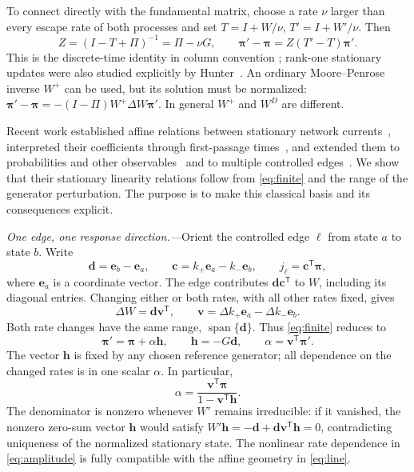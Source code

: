 \documentclass[
  reprint,
  superscriptaddress,
  amsmath,
  amssymb,
  aps,
  pre,
  longbibliography
]{revtex4-2}
\begin{document}
To connect directly with the fundamental matrix, choose a rate
$\nu$ larger than every escape rate of both processes and set
$T=I+W/\nu$, $T'=I+W'/\nu$. Then
\begin{equation}
 Z=(I-T+\Pi)^{-1}=\Pi-\nu G,
 \qquad
 \bm\pi'-\bm\pi=Z(T'-T)\bm\pi'.
 \label{eq:fundamental}
\end{equation}
This is the discrete-time identity in column convention
\cite{Schweitzer1968,Meyer1980}; rank-one stationary updates were also
studied explicitly by Hunter~\cite{Hunter1986}.
An ordinary Moore--Penrose inverse $W^+$ can be used, but its solution
must be normalized:
$\bm\pi'-\bm\pi=-(I-\Pi)W^+\Delta W\bm\pi'$.
In general $W^+$ and $W^D$ are different.

Recent work established affine relations between stationary network
currents~\cite{Harunari2024}, interpreted their coefficients through
first-passage times~\cite{Khodabandehlou2025}, and extended them to
probabilities and other observables~\cite{BebonSpeck2026} and to multiple
controlled edges~\cite{DalCengio2025}. We show that their stationary
linearity relations follow from \cref{eq:finite} and the range of the
generator perturbation. The purpose is to make this classical basis
and its consequences explicit.

\textit{One edge, one response direction.---}Orient the controlled edge
$\ell$ from state $a$ to state $b$. Write
\begin{equation}
 \bm d=\bm e_b-\bm e_a,\qquad
 \bm c=k_+\bm e_a-k_-\bm e_b,
 \qquad j_\ell=\bm c^{\mathsf T}\bm\pi,
 \label{eq:edge}
\end{equation}
where $\bm e_a$ is a coordinate vector. The edge contributes
$\bm d\bm c^{\mathsf T}$ to $W$, including its diagonal entries.
Changing either or both rates, with all other rates fixed, gives
\begin{equation}
 \Delta W=\bm d\bm v^{\mathsf T},\qquad
 \bm v=\Delta k_+\bm e_a-\Delta k_-\bm e_b.
 \label{eq:rankone}
\end{equation}
Both rate changes have the same range, $\operatorname{span}\{\bm d\}$.
Thus \cref{eq:finite} reduces to
\begin{equation}
 \boxed{\bm\pi'=\bm\pi+\alpha\bm h,\qquad
 \bm h=-G\bm d,\qquad \alpha=\bm v^{\mathsf T}\bm\pi'.}
 \label{eq:line}
\end{equation}
The vector $\bm h$ is fixed by any chosen reference generator;
all dependence on the changed rates is in one scalar $\alpha$.
In particular,
\begin{equation}
 \alpha=\frac{\bm v^{\mathsf T}\bm\pi}
                  {1-\bm v^{\mathsf T}\bm h}.
 \label{eq:amplitude}
\end{equation}
The denominator is nonzero whenever $W'$ remains irreducible:
if it vanished, the nonzero zero-sum vector $\bm h$ would satisfy
$W'\bm h=-\bm d+\bm d\bm v^{\mathsf T}\bm h=0$, contradicting
uniqueness of the normalized stationary state.
The nonlinear rate dependence in \cref{eq:amplitude} is fully
compatible with the affine geometry in \cref{eq:line}.
\end{document}
